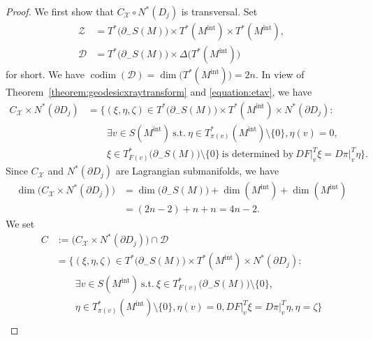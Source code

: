 \documentclass[10pt,a4paper]{amsart}
\begin{document}
\begin{proof}
We first show that $C_\mathcal{X}{\circ}N^\ast(D_j)$  is transversal. 
Set 
%
%
\begin{align*}
  \mathcal{Z}
& =
  T^\ast\bigl(\partial_-S(M)\bigr)
  \times
  T^\ast(M^\text{int})
  \times
  T^\ast(M^\text{int}),
\\
  \mathcal{D}
& =
  T^\ast\bigl(\partial_-S(M)\bigr)
  \times
  \Delta\bigl(T^\ast(M^\text{int})\bigr)
\end{align*}
%
%
for short. We have 
$\operatorname{codim}(\mathcal{D})=\operatorname{dim}\bigl(T^\ast(M^\text{int})\bigr)=2n$. 
In view of Theorem~\ref{theorem:geodesicxraytransform} and \eqref{equation:etav}, we have  
%
%
\begin{align*}
  C_\mathcal{X}{\times}N^\ast({\partial}D_j)
& =
  \bigl\{
  (\xi,\eta,\zeta) 
  \in 
  T^\ast\bigl(\partial_-S(M)\bigr){\times}T^\ast(M^\text{int}){\times}N^\ast(\partial{D_j}): 
\\
& \qquad
  \exists v \in S(M^\text{int})\ \text{s.t.}\  
  \eta \in T^\ast_{\pi(v)}(M^\text{int})\setminus\{0\}, 
  \eta(v)=0, 
\\
& \qquad 
  \xi \in T^\ast_{F(v)}\bigl(\partial_-S(M)\bigr)\setminus\{0\} 
  \ \text{is determined by}\ 
  DF\vert^T_v\xi=D\pi\vert^T_v\eta
  \bigr\}. 
\end{align*}
%
%
Since $C_\mathcal{X}$ and $N^\ast(\partial{D_j})$ are Lagrangian submanifolds, we have 
%
%
\begin{align*}
  \operatorname{dim}\bigl(C_\mathcal{X}{\times}N^\ast({\partial}D_j)\bigr)
& = 
  \operatorname{dim}\bigl(\partial_-S(M)\bigr)
  +
  \operatorname{dim}(M^\text{int})
  +
  \operatorname{dim}(M^\text{int})
\\
& =
  (2n-2)+n+n
  =4n-2.
\end{align*} 
%
%
We set 
%
%
\begin{align}
  C
& :=
  \bigl(C_\mathcal{X}{\times}N^\ast({\partial}D_j)\bigr)\cap\mathcal{D}
\nonumber
\\
& =
  \bigl\{
  (\xi,\eta,\zeta) 
  \in 
  T^\ast\bigl(\partial_-S(M)\bigr){\times}T^\ast(M^\text{int}){\times}N^\ast(\partial{D_j}): 
\nonumber
\\
& \qquad 
  \exists v \in S(M^\text{int})\ \text{s.t.}\  
  \xi \in T^\ast_{F(v)}\bigl(\partial_-S(M)\bigr)\setminus\{0\}, 
\nonumber
\\
& \qquad
  \eta \in T^\ast_{\pi(v)}(M^\text{int})\setminus\{0\}, 
  \eta(v)=0, 
  DF\vert^T_v\xi=D\pi\vert^T_v\eta,\eta=\zeta\}
\nonumber
\\

\end{align}
\end{proof}
\end{document}
